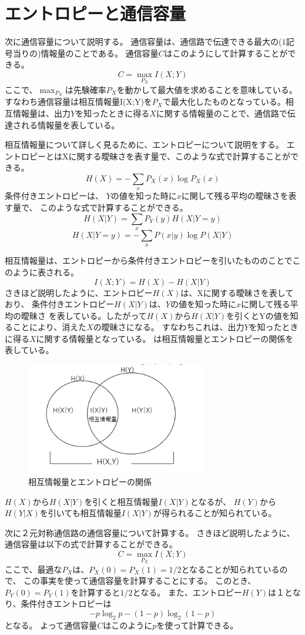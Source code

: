 \chapter{エントロピーと通信容量}
次に通信容量について説明する。
通信容量は、通信路で伝達できる最大の($1$記号当りの)情報量のことである。
通信容量$C$はこのようにして計算することができる。
$$
C=\max_{P_X}I(X;Y)
$$
ここで、$\max_{P_X}$は先験確率$P_X$を動かして最大値を求めることを意味している。
すなわち通信容量は相互情報量I(X;Y)を$P_X$で最大化したものとなっている。相互情報量は、出力$Y$を知ったときに得る$X$に関する情報量のことで、通信路で伝達される情報量を表している。



相互情報量について詳しく見るために、エントロピーについて説明をする。
エントロピーとはXに関する曖昧さを表す量で、このような式で計算することができる。
$$
H(X)=-\sum_xP_X(x)\log P_X(x)
$$
条件付きエントロピーは、
$Y$の値を知った時に$x$に関して残る平均の曖昧さを表す量で、
このような式で計算することができる。
$$
H(X|Y)=\sum_xP_Y(y)H(X|Y=y)$$
$$
H(X|Y=y)=-\sum_xP(x|y)\log P(X|Y)
$$




相互情報量は、エントロピーから条件付きエントロピーを引いたもののことでこのように表される。
$$
I(X;Y)=H(X)-H(X|Y)
$$
さきほど説明したように、エントロピー$H(X)$は、Xに関する曖昧さを表しており、
条件付きエントロピー$H(X|Y)$は、$Y$の値を知った時に$x$に関して残る平均の曖昧さ
を表している。したがって$H(X)$から$H(X|Y)$を引くとYの値を知ることにより、消えた$X$の曖昧さになる。
すなわちこれは、出力$Y$を知ったときに得る$X$に関する情報量となっている。
は相互情報量とエントロピーの関係を表している。


    \begin{figure}[H]
        \centering   
        \includegraphics[width=0.7\textwidth]{img/Fig2.png}
        \caption[sample image (png)]{相互情報量とエントロピーの関係}
        \label{Fig3_1}
    \end{figure}


$H(X)$から$H(X|Y)$を引くと相互情報量$I(X|Y)$となるが、
$H(Y)$から$H(Y|X)$を引いても相互情報量$I(X|Y)$が得られることが知られている。


次に２元対称通信路の通信容量について計算する。
さきほど説明したように、通信容量は以下の式で計算することができる。
$$
C=\max_{P_X}I(X;Y)
$$
ここで、最適な$P_X$は、$P_X(0)=P_X(1)=1/2$となることが知られているので、
この事実を使って通信容量を計算することにする。
このとき、$P_Y(0)=P_Y(1)$を計算すると$1/2$となる。
また、エントロピー$H(Y)$は$１$となり、条件付きエントロピーは
$$
-p\log_2p-(1-p)\log_2(1-p)
$$
となる。
よって通信容量$C$はこのように$p$を使って計算できる。


